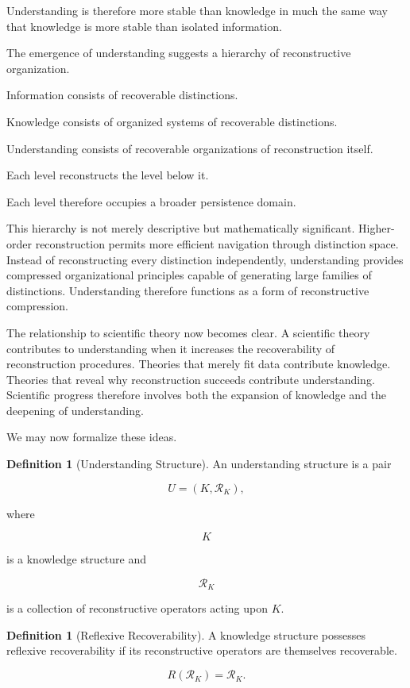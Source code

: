 \documentclass[12pt,oneside]{article}
\theoremstyle{definition}
\newtheorem{definition}[theorem]{Definition} \newtheorem{axiom}[theorem]{Axiom} \newtheorem{remark}[theorem]{Remark} \newtheorem{example}[theorem]{Example}
\begin{document}
Understanding is therefore more stable than knowledge in much the same way that knowledge is more stable than isolated information.

The emergence of understanding suggests a hierarchy of reconstructive organization.

Information consists of recoverable distinctions.

Knowledge consists of organized systems of recoverable distinctions.

Understanding consists of recoverable organizations of reconstruction itself.

Each level reconstructs the level below it.

Each level therefore occupies a broader persistence domain.

This hierarchy is not merely descriptive but mathematically significant. Higher-order reconstruction permits more efficient navigation through distinction space. Instead of reconstructing every distinction independently, understanding provides compressed organizational principles capable of generating large families of distinctions. Understanding therefore functions as a form of reconstructive compression.

The relationship to scientific theory now becomes clear. A scientific theory contributes to understanding when it increases the recoverability of reconstruction procedures. Theories that merely fit data contribute knowledge. Theories that reveal why reconstruction succeeds contribute understanding. Scientific progress therefore involves both the expansion of knowledge and the deepening of understanding.

We may now formalize these ideas.

\begin{definition}[Understanding Structure]

An understanding structure is a pair

\[
U=(K,\mathcal R_K),
\]

where

\[
K
\]

is a knowledge structure and

\[
\mathcal R_K
\]

is a collection of reconstructive operators acting upon \(K\).

\end{definition}

\begin{definition}[Reflexive Recoverability]

A knowledge structure possesses reflexive recoverability if its reconstructive operators are themselves recoverable.

\[
R(\mathcal R_K)=\mathcal R_K.
\]

\end{definition}
\end{document}

